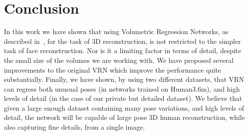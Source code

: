 
\section{Conclusion}

In this work we have shown that using Volumetric Regression Networks,
as described in~\cite{jackson2017vrn}, for the task of 3D
reconstruction, is not restricted to the simpler task of face
reconstruction. Nor is it a limiting factor in terms of detail,
despite the small size of the volumes we are working with. We have
proposed several improvements to the original VRN which improve the
performance quite substantially. Finally, we have shown, by using two
different datasets, that VRN can regress both unusual poses (in
networks trained on Human3.6m), and high levels of detail (in the case
of our private but detailed dataset). We believe that given a large
enough dataset containing many pose variations, and high levels of
detail, the network will be capable of large pose 3D human
reconstruction, while also capturing fine details, from a single
image.






% 
% 
% 


